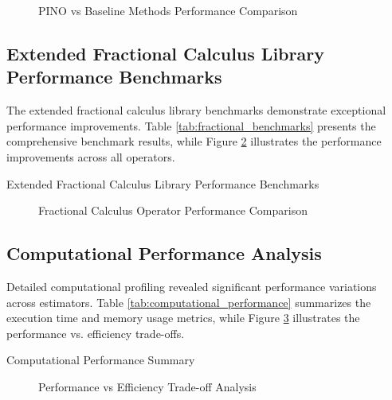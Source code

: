 \begin{figure}[h]
\centering
\caption{PINO vs Baseline Methods Performance Comparison}
\label{fig:pino_comparison}
\end{figure}

\subsection{Extended Fractional Calculus Library Performance Benchmarks}

The extended fractional calculus library benchmarks demonstrate exceptional performance improvements. Table \ref{tab:fractional_benchmarks} presents the comprehensive benchmark results, while Figure \ref{fig:fractional_performance} illustrates the performance improvements across all operators.

\begin{table}[h]
\centering
\caption{Extended Fractional Calculus Library Performance Benchmarks}
\label{tab:fractional_benchmarks}
\end{table}

\begin{figure}[h]
\centering
\caption{Fractional Calculus Operator Performance Comparison}
\label{fig:fractional_performance}
\end{figure}

\subsection{Computational Performance Analysis}

Detailed computational profiling revealed significant performance variations across estimators. Table \ref{tab:computational_performance} summarizes the execution time and memory usage metrics, while Figure \ref{fig:performance_efficiency} illustrates the performance vs. efficiency trade-offs.

\begin{table}[h]
\centering
\caption{Computational Performance Summary}
\label{tab:computational_performance}
\end{table}

\begin{figure}[h]
\centering
\caption{Performance vs Efficiency Trade-off Analysis}
\label{fig:performance_efficiency}
\end{figure}
